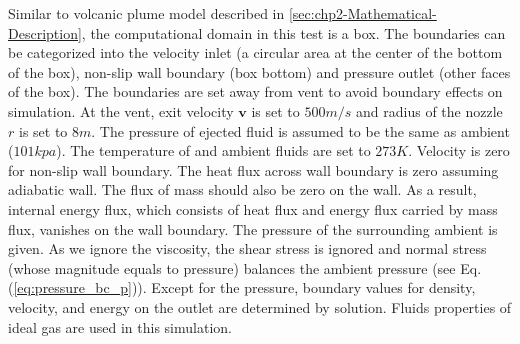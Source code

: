 Similar to volcanic plume model described in \ref{sec:chp2-Mathematical-Description}, the computational domain in this test is a box. The boundaries can be categorized into the velocity inlet (a circular area at the center of the bottom of the box), non-slip wall boundary (box bottom) and pressure outlet (other faces of the box). The boundaries are set away from vent to avoid boundary effects on simulation.
At the vent, exit velocity $\textbf{v}$ is set to $500 m / s$ and radius of the nozzle $r$ is set to $8m $. The pressure of ejected fluid is assumed to be the same as ambient ($101 kpa$). The temperature of and ambient fluids are set to $273 K$. 
Velocity is zero for non-slip wall boundary. The heat flux across wall boundary is zero assuming adiabatic wall. The flux of mass should also be zero on the wall. As a result, internal energy flux, which consists of heat flux and energy flux carried by mass flux, vanishes on the wall boundary. 
The pressure of the surrounding ambient is given. As we ignore the viscosity, the shear stress is ignored and normal stress (whose magnitude equals to pressure) balances the ambient pressure (see Eq. (\ref{eq:pressure_bc_p})).
Except for the pressure, boundary values for density, velocity, and energy on the outlet are determined by solution. Fluids properties of ideal gas are used in this simulation.


